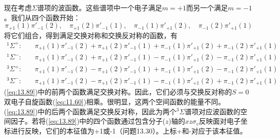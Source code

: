     现在考虑$\Sigma$谱项的波函数。这些谱项中一个电子满足$m=+1$而另一个满足$m=-1$。我们从四个函数开始：
    \begin{equation*}
        \pi_{+1}\left(1\right)\pi'_{-1}\left(2\right), \quad \pi_{+1}\left(2\right)\pi'_{-1}\left(1\right), \quad \pi_{-1}\left(1\right)\pi'_{+1}\left(2\right), \quad \pi_{-1}\left(2\right)\pi'_{+1}\left(1\right)
    \end{equation*}
    将它们组合，得到满足交换对称和交换反对称的函数，有
    \begin{equation}
        \begin{aligned}
            ^1\Sigma^+: & \quad \pi_{+1}\left(1\right)\pi'_{-1}\left(2\right) + \pi_{+1}\left(2\right)\pi'_{-1}\left(1\right) + \pi_{-1}\left(1\right)\pi'_{+1}\left(2\right) + \pi_{-1}\left(2\right)\pi'_{+1}\left(1\right)\\
            ^1\Sigma^-: & \quad \pi_{+1}\left(1\right)\pi'_{-1}\left(2\right) + \pi_{+1}\left(2\right)\pi'_{-1}\left(1\right) - \pi_{-1}\left(1\right)\pi'_{+1}\left(2\right) - \pi_{-1}\left(2\right)\pi'_{+1}\left(1\right)\\
            ^3\Sigma^+: & \quad \pi_{+1}\left(1\right)\pi'_{-1}\left(2\right) - \pi_{+1}\left(2\right)\pi'_{-1}\left(1\right) + \pi_{-1}\left(1\right)\pi'_{+1}\left(2\right) - \pi_{-1}\left(2\right)\pi'_{+1}\left(1\right)\\
            ^3\Sigma^-: & \quad \pi_{+1}\left(1\right)\pi'_{-1}\left(2\right) - \pi_{+1}\left(2\right)\pi'_{-1}\left(1\right) - \pi_{-1}\left(1\right)\pi'_{+1}\left(2\right) + \pi_{-1}\left(2\right)\pi'_{+1}\left(1\right)            
        \end{aligned} 
        \label{eq:13.89} 
    \end{equation}
    (\ref{eq:13.89})中的前两个函数满足交换对称。因此，它们必须与交换反对称的$S=0$双电子自旋函数(\ref{eq:11.60})相乘。很明显，这两个空间函数的能量不同。(\ref{eq:13.89})中的后两个函数满足交换反对称，因此为两个$^3\Sigma$谱项对应波函数的空间因子。若将(\ref{eq:13.89})中的四个函数通过包含分子($z$)轴的$xz\sigma_v$反映面对电子坐标进行反映，它们的本征值为+1或-1（问题13.30）。上标+和-对应于该本征值。

